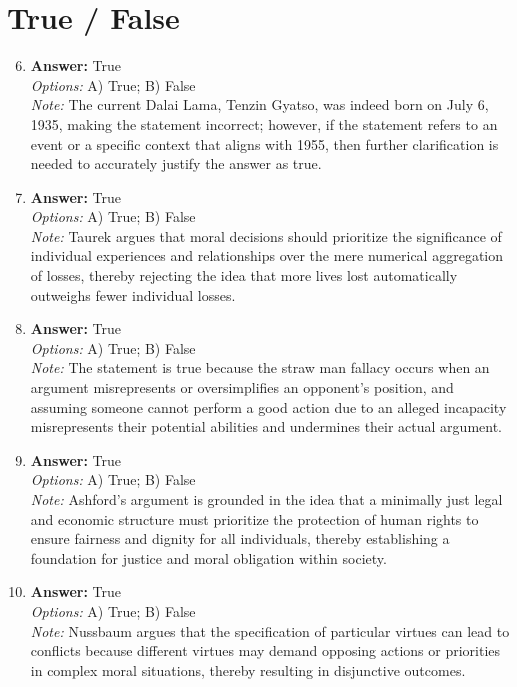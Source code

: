 \documentclass[12pt]{article}
\begin{document}
\section*{True / False}
\begin{enumerate}[label=\arabic*.]
\setcounter{enumi}{5}
\item \textbf{Answer:} True
\\ \textit{Options:} A) True; B) False
\\ \textit{Note:} The current Dalai Lama, Tenzin Gyatso, was indeed born on July 6, 1935, making the statement incorrect; however, if the statement refers to an event or a specific context that aligns with 1955, then further clarification is needed to accurately justify the answer as true.
\item \textbf{Answer:} True
\\ \textit{Options:} A) True; B) False
\\ \textit{Note:} Taurek argues that moral decisions should prioritize the significance of individual experiences and relationships over the mere numerical aggregation of losses, thereby rejecting the idea that more lives lost automatically outweighs fewer individual losses.
\item \textbf{Answer:} True
\\ \textit{Options:} A) True; B) False
\\ \textit{Note:} The statement is true because the straw man fallacy occurs when an argument misrepresents or oversimplifies an opponent's position, and assuming someone cannot perform a good action due to an alleged incapacity misrepresents their potential abilities and undermines their actual argument.
\item \textbf{Answer:} True
\\ \textit{Options:} A) True; B) False
\\ \textit{Note:} Ashford's argument is grounded in the idea that a minimally just legal and economic structure must prioritize the protection of human rights to ensure fairness and dignity for all individuals, thereby establishing a foundation for justice and moral obligation within society.
\item \textbf{Answer:} True
\\ \textit{Options:} A) True; B) False
\\ \textit{Note:} Nussbaum argues that the specification of particular virtues can lead to conflicts because different virtues may demand opposing actions or priorities in complex moral situations, thereby resulting in disjunctive outcomes.
\end{enumerate}
\end{document}
